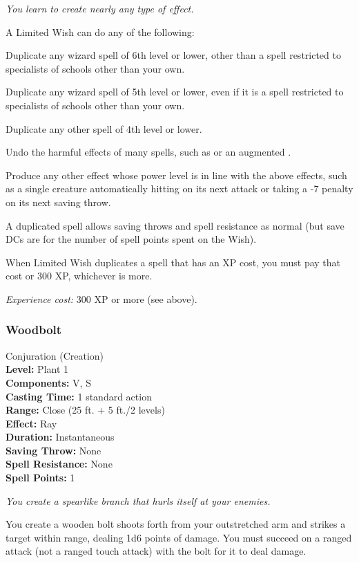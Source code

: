 \emph{You learn to create nearly any type of effect.}

A Limited Wish can do any of the following:
\begin{list}{}{\leftmargin=1em}
\item Duplicate any wizard spell of 6th level or lower, other than a spell restricted to specialists of schools other than your own.
\item Duplicate any wizard spell of 5th level or lower,  even if it is a spell restricted to specialists of schools other than your own.
\item Duplicate any other spell of 4th level or lower.
\item Undo the harmful effects of many spells, such as  or an augmented .
\item Produce any other effect whose power level is in line with the above effects, 
such as a single creature automatically hitting on its next attack or taking a -7 penalty on its next saving throw.
\end{list}
A duplicated spell allows saving throws and spell resistance as normal (but save DCs are for the number of spell points spent on the Wish).

When Limited Wish duplicates a spell that has an XP cost, you must pay that cost or 300 XP, whichever is more. 

\emph{Experience cost:} 300 XP or more (see above).
\subsubsection{Woodbolt}
\label{Spell:Woodbolt}
Conjuration (Creation)
\\ \textbf{Level:} Plant 1
\\ \textbf{Components:} V, S
\\ \textbf{Casting Time:} 1 standard action
\\ \textbf{Range:} Close (25 ft. + 5 ft./2 levels)
\\ \textbf{Effect:} Ray
\\ \textbf{Duration:} Instantaneous
\\ \textbf{Saving Throw:} None
\\ \textbf{Spell Resistance:} None
\\ \textbf{Spell Points:} 1

\emph{You create a spearlike branch that hurls itself at your enemies.}

You create a wooden bolt shoots forth from your outstretched arm and strikes a target within range, dealing 1d6 points of damage.
You must succeed on a ranged attack (not a ranged touch attack) with the bolt for it to deal damage.


